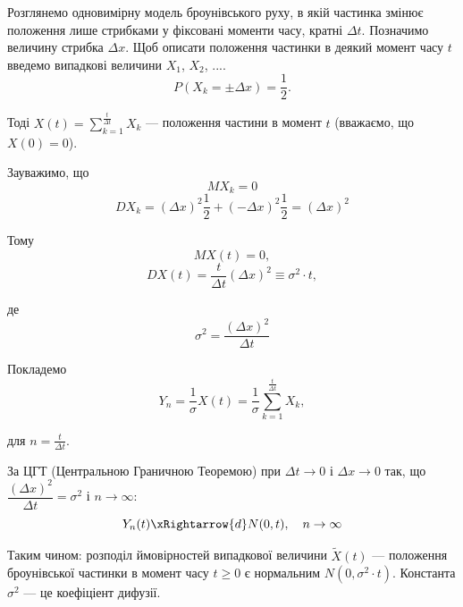 \begin{example}
    Розглянемо одновимірну модель броунівського руху, 
    в якій частинка змінює положення лише стрибками
    у фіксовані моменти  часу, кратні $\Delta t$.
    Позначимо величину стрибка $\Delta x$.
    Щоб описати положення частинки в деякий момент часу
    $t$ введемо випадкові величини $X_1$, $X_2$, ....
    $$P(X_k = \pm \Delta x) = \dfrac{1}{2}.$$
    
    Тоді $X(t) = \sum\limits_{k=1}^{\frac{t}{\Delta t}} X_k$ ---
    положення частини в момент $t$ (вважаємо, що $X(0) = 0$).
    
    Зауважимо, що
    $$MX_k = 0$$
    $$DX_k = (\Delta x)^2 \dfrac{1}{2} + (-\Delta x)^2 \dfrac{1}{2} = (\Delta x)^2$$
    
    Тому
    $$MX(t) = 0,$$
    $$DX(t) = \dfrac{t}{\Delta t} (\Delta x)^2 \equiv \sigma^2 \cdot t,$$
    
    де
    $$\sigma^2 = \dfrac{(\Delta x)^2}{\Delta t}$$
    
    Покладемо
    $$Y_n
    = \dfrac{1}{\sigma} X(t)
    = \dfrac{1}{\sigma} \sum\limits_{k=1}^{\frac{t}{\Delta t}} X_k,$$
    
    для $n = \frac{t}{\Delta t}$.
    
    За ЦГТ (Центральною Граничною Теоремою) при 
    $\Delta t \rightarrow 0$ і $\Delta x \rightarrow 0$ так, що
    $\dfrac{(\Delta x)^2}{\Delta t} = \sigma^2$ і $n \rightarrow \infty$:
    $$Y_n(t) \xRightarrow{d} N(0, t), \quad n \rightarrow \infty$$
    
    Таким чином: розподіл ймовірностей випадкової
    величини $\widetilde{X}(t)$ --- положення броунівської частинки в
    момент часу $t \geqslant 0$ є нормальним $N(0, \sigma^2 \cdot t)$.
    Константа $\sigma^2$ --- це коефіціент дифузії.
\end{example}


